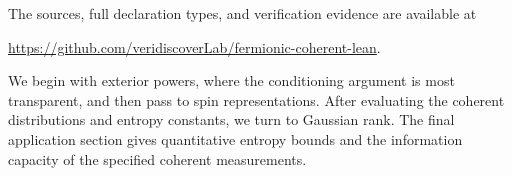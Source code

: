 The sources, full declaration types, and verification evidence are available at
\begin{center}
 \small\url{https://github.com/veridiscoverLab/fermionic-coherent-lean}.
\end{center}
We begin with exterior powers, where the conditioning argument is most
transparent, and then pass to spin representations. After evaluating the
coherent distributions and entropy constants, we turn to Gaussian rank.
The final application section gives quantitative entropy bounds and the
information capacity of the specified coherent measurements.

